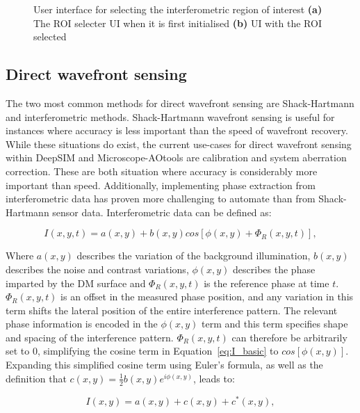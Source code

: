 \begin{figure}[h]
\begin{subfigure}{0.4\textwidth}
		\caption{}
		\label{fig:ROI_selector}
	\end{subfigure}
	\caption[User interface for selecting the interferometric region of interest]{User interface for selecting the interferometric region of interest \textbf{(a)} The ROI selecter UI when it is first initialised \textbf{(b)} UI with the ROI selected}
	\label{fig:ROI_selectors}
\end{figure}

\subsection{Direct wavefront sensing}
\label{subsec:direct_wavefront_sensing}

The two most common methods for direct wavefront sensing are Shack-Hartmann and interferometric methods. Shack-Hartmann wavefront sensing is useful for instances where accuracy is less important than the speed of wavefront recovery. While these situations do exist, the current use-cases for direct wavefront sensing within DeepSIM and Microscope-AOtools are calibration and system aberration correction. These are both situation where accuracy is considerably more important than speed. Additionally, implementing phase extraction from interferometric data has proven more challenging  to automate than from Shack-Hartmann sensor data. Interferometric data can be defined as:

\begin{equation}\label{eq:I_basic}
I(x,y,t) = a(x,y) + b(x,y)cos[\phi(x,y) + \Phi_{R}(x,y,t)],
\end{equation}

Where $a(x,y)$ describes the variation of the background illumination, $b(x,y)$ describes the noise and contrast variations, $\phi(x,y)$ describes the phase imparted by the DM surface and $\Phi_{R}(x,y,t)$ is the reference phase at time $t$. $\Phi_{R}(x,y,t)$ is an offset in the measured phase position, and any variation in this term shifts the lateral position of the entire interference pattern. The relevant phase information is encoded in the $\phi(x,y)$ term and this term specifies shape and spacing of the interference pattern. $\Phi_{R}(x,y,t)$ can therefore be arbitrarily set to 0, simplifying the cosine term in Equation~\ref{eq:I_basic} to $cos[\phi(x,y)]$. Expanding this simplified cosine term using Euler's formula, as well as the definition that $c(x,y) = \frac{1}{2}b(x,y)e^{i\phi(x,y)}$, leads to:

\begin{equation}\label{eq:I_cos_expand}
I(x,y) = a(x,y) + c(x,y) + c^{*}(x,y),
\end{equation}


